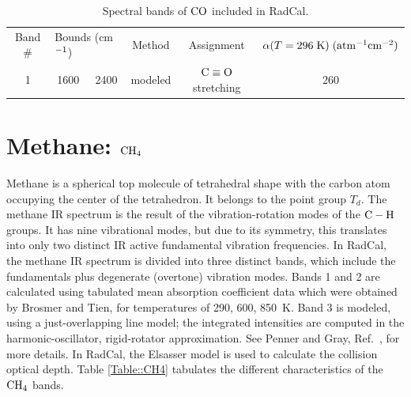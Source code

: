 \begin{table}[ht]
      \centering
      \caption{Spectral bands of $\rm CO$ included in RadCal.}
      \label{Table::CO}
    \begin{tabular}{|c|c|c|c|c|c|}
    \hline
    Band \# & \multicolumn{2}{|l|}{Bounds (cm$\rm ^{-1}$) } & Method & Assignment & $\alpha(T=296 \; {\rm K}) \; (\rm {atm^{-1} cm^{-2}})$   \\
    \cline{1-6}
    1 & 1600 & 2400 & modeled &  $\rm C\equiv O$ stretching & 260  \\
    \hline
   \end{tabular}
\end{table}


\clearpage

\section{Methane: $\rm CH_4$}

Methane is a spherical top molecule of tetrahedral shape with the carbon atom occupying the center of the tetrahedron. It belongs to the point group $T_d$. The methane IR spectrum is the result of the vibration-rotation modes of the $\rm C-H$ groups. It has nine vibrational modes, but due to its symmetry, this translates into only two distinct IR active fundamental vibration frequencies. In RadCal, the methane IR spectrum is divided into three distinct bands, which include the fundamentals plus degenerate (overtone) vibration modes. Bands 1 and 2 are calculated using tabulated mean absorption coefficient data which were obtained by Brosmer and Tien, \cite{Brosmer1985} for temperatures of 290, 600, 850~K. Band 3 is modeled, using a just-overlapping line model; the integrated intensities are computed in the harmonic-oscillator, rigid-rotator approximation. See Penner and Gray, Ref.~\cite{Gray1965}, for more details. In RadCal, the Elsasser model is used to calculate the collision optical depth. Table \ref{Table::CH4} tabulates the different characteristics of the $\rm CH_4$ bands.


